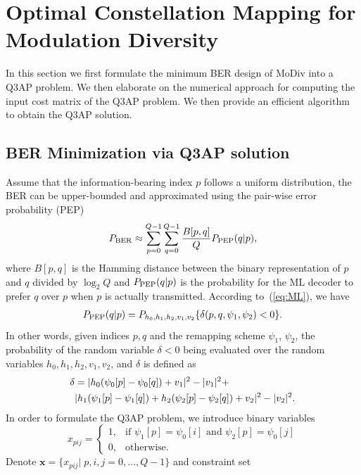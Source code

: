 \documentclass[journal]{IEEEtran}
\newcommand{\PEP}{\rm{PEP}}
\newcommand{\BER}{\rm{BER}}
\begin{document}
\section{Optimal Constellation Mapping for Modulation Diversity}
\label{sec:core}
In this section we first formulate the minimum BER design of MoDiv into a Q3AP problem.
We then elaborate on the numerical approach for computing the input cost matrix of the Q3AP
problem. We then provide an efficient algorithm to obtain the Q3AP solution.

\subsection{BER Minimization via Q3AP solution}
Assume that the information-bearing index $p$ follows a uniform distribution,
the BER can be upper-bounded and approximated using the pair-wise error
probability (PEP)~\cite{harvind2005symbol}
\begin{align}
    P_{\BER} \approx \sum_{p=0}^{Q - 1}\sum_{q=0}^{Q - 1}\frac{B[p,
    q]}{Q}P_{\PEP}(q | p), \label{eq:P_BER}
\end{align}
where $B[p,q]$ is the Hamming distance between the binary representation of $p$
and $q$ divided by $\log_2Q$ and $P_{\PEP}(q | p)$ is the probability for the ML
decoder to prefer $q$ over $p$ when $p$ is actually transmitted. According to~(\ref{eq:ML}), we have
\begin{align}
    P_{\PEP}(q | p) = P_{h_0,h_1,h_2,v_1,v_2}\{\delta(p,q,\psi_1,\psi_2) < 0\}.
    \label{eq:P_PEP}
\end{align}
In other words, given indices $p, q$ and the remapping scheme $\psi_1$, $\psi_2$, the
probability of the random variable $\delta<0$ being evaluated over the random
variables $h_0,h_1,h_2,v_1,v_2$, and $\delta$ is defined as
\begin{align}
    \delta & = |h_0(\psi_0[p] - \psi_0[q]) + v_1|^2 - |v_1|^2 +\notag\\ 
    &
    |h_1(\psi_1[p] - \psi_1[q])+h_2(\psi_2[p] - \psi_2[q])+v_2|^2 -
    |v_2|^2.
    \label{eq:delta}
\end{align}
In order to formulate the Q3AP problem, we introduce binary variables
\[
x_{pij}= \left\{\begin{array}{ll}
1,& \mbox{if $\psi_1[p] = \psi_0[i]$ and $\psi_2[p] = \psi_0[j]$}\\
 0,& \mbox{otherwise.} \end{array} \right. \]
Denote $\mathbf{x} = \{x_{pij}|\;p,i,j=0,\ldots,Q-1\}$
and constraint set
\end{document}
